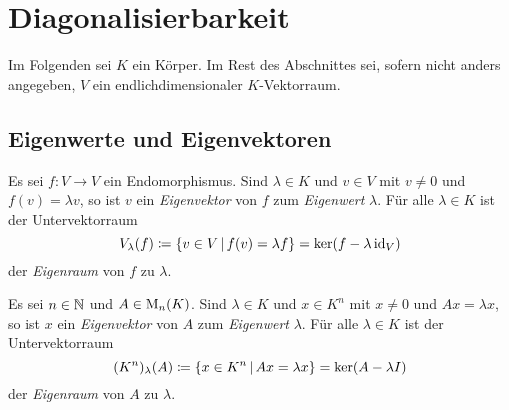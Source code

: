 \section{Diagonalisierbarkeit}

Im Folgenden sei $K$ ein Körper.
Im Rest des Abschnittes sei, sofern nicht anders angegeben, $V$ ein endlichdimensionaler $K$-Vektorraum.





\subsection{Eigenwerte und Eigenvektoren}

\begin{definition}
  Es sei $f \colon V \to V$ ein Endomorphismus.
  Sind $\lambda \in K$ und $v \in V$ mit $v \neq 0$ und $f(v) = \lambda v$, so ist $v$ ein \emph{Eigenvektor} von $f$ zum \emph{Eigenwert} $\lambda$.
  Für alle $\lambda \in K$ ist der Untervektorraum
  \[
              V_{\lambda}(f)
    \coloneqq \{ v \in V \,|\, f(v) = \lambda f \}
    =         \ker (f - \lambda \operatorname{id}_V)
  \]
  der \emph{Eigenraum} von $f$ zu $\lambda$.

  Es sei $n \in \mathbb{N}$ und $A \in \operatorname{M}_{n}(K)$.
  Sind $\lambda \in K$ und $x \in K^n$ mit $x \neq 0$ und $Ax = \lambda x$, so ist $x$ ein \emph{Eigenvektor} von $A$ zum \emph{Eigenwert} $\lambda$.
  Für alle $\lambda \in K$ ist der Untervektorraum
  \[
              (K^n)_{\lambda}(A)
    \coloneqq \{ x \in K^n \,|\, Ax = \lambda x \}
    =         \ker (A - \lambda I)
  \]
  der \emph{Eigenraum} von $A$ zu $\lambda$.
\end{definition}


